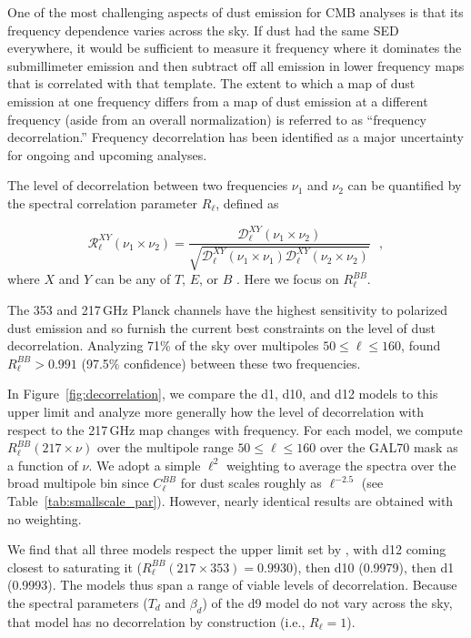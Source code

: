 \documentclass[twocolumn]{aastex631}
\begin{document}
One of the most challenging aspects of dust emission for CMB analyses is that its frequency dependence varies across the sky. If dust had the same SED everywhere, it would be sufficient to measure it frequency where it dominates the submillimeter emission and then subtract off all emission in lower frequency maps that is correlated with that template. The extent to which a map of dust emission at one frequency differs from a map of dust emission at a different frequency (aside from an overall normalization) is referred to as ``frequency decorrelation.'' Frequency decorrelation has been identified as a major uncertainty for ongoing and upcoming analyses.

The level of decorrelation between two frequencies $\nu_1$ and $\nu_2$ can be quantified by the spectral correlation parameter $R_\ell$, defined as

\begin{equation} \label{eq:R_ell}
    \mathcal{R}^{XY}_\ell(\nu_1\times\nu_2) = \frac{\mathcal{D}_\ell^{XY}(\nu_1\times\nu_2)}{\sqrt{\mathcal{D}_\ell^{XY}(\nu_1\times\nu_1)\mathcal{D}_\ell^{XY}(\nu_2\times\nu_2)}}
    ~~~,
\end{equation}
where $X$ and $Y$ can be any of $T$, $E$, or $B$ \citep{planck2016-L}. Here we focus on $R_\ell^{BB}$.

The 353 and 217\,GHz Planck channels have the highest sensitivity to polarized dust emission and so furnish the current best constraints on the level of dust decorrelation. Analyzing 71\% of the sky over multipoles $50 \leq \ell \leq 160$, \citet{planck2016-l11A} found $R_\ell^{BB} > 0.991$ (97.5\% confidence) between these two frequencies.

In Figure~\ref{fig:decorrelation}, we compare the d1, d10, and d12 models to this upper limit and analyze more generally how the level of decorrelation with respect to the 217\,GHz map changes with frequency. For each model, we compute $R_\ell^{BB}\left(217\times\nu\right)$ over the multipole range $50 \leq \ell \leq 160$ over the GAL70 mask as a function of $\nu$. We adopt a simple $\ell^2$ weighting to average the spectra over the broad multipole bin since $C_\ell^{BB}$ for dust scales roughly as $\ell^{-2.5}$ (see Table~\ref{tab:smallscale_par}). However, nearly identical results are obtained with no weighting.

We find that all three models respect the upper limit set by \citet{planck2016-l11A}, with d12 coming closest to saturating it ($R_\ell^{BB}(217\times353) = 0.9930$), then d10 (0.9979), then d1 (0.9993). The models thus span a range of viable levels of decorrelation. Because the spectral parameters ($T_d$ and $\beta_d$) of the d9 model do not vary across the sky, that model has no decorrelation by construction (i.e., $R_\ell = 1$).
\end{document}
